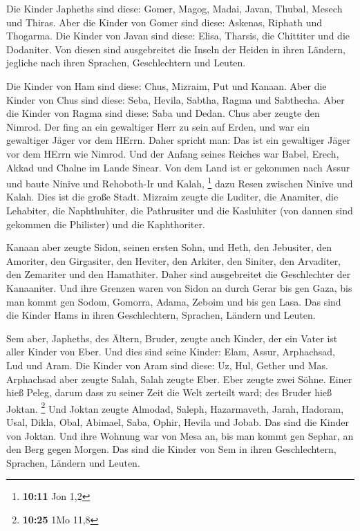  Die Kinder Japheths sind diese: Gomer, Magog, Madai,
Javan, Thubal, Mesech und Thiras.  Aber die Kinder von
Gomer sind diese: Askenas, Riphath und Thogarma.  Die
Kinder von Javan sind diese: Elisa, Tharsis, die Chittiter und die
Dodaniter.  Von diesen sind ausgebreitet die Inseln der
Heiden in ihren Ländern, jegliche nach ihren Sprachen, Geschlechtern und
Leuten.

 Die Kinder von Ham sind diese: Chus, Mizraim, Put und
Kanaan.  Aber die Kinder von Chus sind diese: Seba,
Hevila, Sabtha, Ragma und Sabthecha. Aber die Kinder von Ragma sind
diese: Saba und Dedan.  Chus aber zeugte den Nimrod. Der
fing an ein gewaltiger Herr zu sein auf Erden,  und war
ein gewaltiger Jäger vor dem HErrn. Daher spricht man: Das ist ein
gewaltiger Jäger vor dem HErrn wie Nimrod.  Und der
Anfang seines Reiches war Babel, Erech, Akkad und Chalne im Lande
Sinear.  Von dem Land ist er gekommen nach Assur und
baute Ninive und Rehoboth-Ir und Kalah, \footnote{\textbf{10:11} Jon 1,2}
 dazu Resen zwischen Ninive und Kalah. Dies ist die große
Stadt.  Mizraim zeugte die Luditer, die Anamiter, die
Lehabiter, die Naphthuhiter,  die Pathrusiter und die
Kasluhiter (von dannen sind gekommen die Philister) und die
Kaphthoriter.

 Kanaan aber zeugte Sidon, seinen ersten Sohn, und Heth,
 den Jebusiter, den Amoriter, den Girgasiter,
 den Heviter, den Arkiter, den Siniter, 
den Arvaditer, den Zemariter und den Hamathiter. Daher sind ausgebreitet
die Geschlechter der Kanaaniter.  Und ihre Grenzen waren
von Sidon an durch Gerar bis gen Gaza, bis man kommt gen Sodom, Gomorra,
Adama, Zeboim und bis gen Lasa.  Das sind die Kinder Hams
in ihren Geschlechtern, Sprachen, Ländern und Leuten.

 Sem aber, Japheths, des Ältern, Bruder, zeugte auch
Kinder, der ein Vater ist aller Kinder von Eber.  Und
dies sind seine Kinder: Elam, Assur, Arphachsad, Lud und Aram.
 Die Kinder von Aram sind diese: Uz, Hul, Gether und Mas.
 Arphachsad aber zeugte Salah, Salah zeugte Eber.
 Eber zeugte zwei Söhne. Einer hieß Peleg, darum dass zu
seiner Zeit die Welt zerteilt ward; des Bruder hieß Joktan. \footnote{\textbf{10:25}
  1Mo 11,8}  Und Joktan zeugte Almodad, Saleph,
Hazarmaveth, Jarah,  Hadoram, Usal, Dikla,
 Obal, Abimael, Saba,  Ophir, Hevila und
Jobab. Das sind die Kinder von Joktan.  Und ihre Wohnung
war von Mesa an, bis man kommt gen Sephar, an den Berg gegen Morgen.
 Das sind die Kinder von Sem in ihren Geschlechtern,
Sprachen, Ländern und Leuten.

